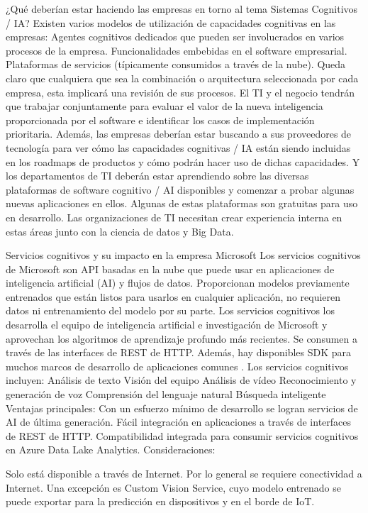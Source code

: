 ¿Qué deberían estar haciendo las empresas en torno al tema Sistemas Cognitivos / IA?
Existen varios modelos de utilización de capacidades cognitivas en las empresas:
Agentes cognitivos dedicados que pueden ser involucrados en varios procesos de la empresa.
Funcionalidades embebidas en el software empresarial.
Plataformas de servicios (típicamente consumidos a través de la nube).
Queda claro que cualquiera que sea la combinación o arquitectura seleccionada por cada empresa, esta implicará una revisión de sus procesos. El TI y el negocio tendrán que trabajar conjuntamente para evaluar el valor de la nueva inteligencia proporcionada por el software e identificar los casos de implementación prioritaria. Además, las empresas deberían estar buscando a sus proveedores de tecnología para ver cómo las capacidades cognitivas / IA están siendo incluidas en los roadmaps de productos y cómo podrán hacer uso de dichas capacidades. Y los departamentos de TI deberán estar aprendiendo sobre las diversas plataformas de software cognitivo / AI disponibles y comenzar a probar algunas nuevas aplicaciones en ellos. Algunas de estas plataformas son gratuitas para uso en desarrollo. Las organizaciones de TI necesitan crear experiencia interna en estas áreas junto con la ciencia de datos y Big Data.

Servicios cognitivos y su impacto en la empresa Microsoft
Los servicios cognitivos de Microsoft son API basadas en la nube que puede usar en aplicaciones de inteligencia artificial (AI) y flujos de datos. Proporcionan modelos previamente entrenados que están listos para usarlos en cualquier aplicación, no requieren datos ni entrenamiento del modelo por su parte. Los servicios cognitivos los desarrolla el equipo de inteligencia artificial e investigación de Microsoft y aprovechan los algoritmos de aprendizaje profundo más recientes. Se consumen a través de las interfaces de REST de HTTP. Además, hay disponibles SDK para muchos marcos de desarrollo de aplicaciones comunes \cite{Microsoft2022}.
Los servicios cognitivos incluyen:
Análisis de texto
Visión del equipo
Análisis de vídeo
Reconocimiento y generación de voz
Comprensión del lenguaje natural
Búsqueda inteligente
Ventajas principales:
Con un esfuerzo mínimo de desarrollo se logran servicios de AI de última generación.
Fácil integración en aplicaciones a través de interfaces de REST de HTTP.
Compatibilidad integrada para consumir servicios cognitivos en Azure Data Lake Analytics.
Consideraciones:

Solo está disponible a través de Internet. Por lo general se requiere conectividad a Internet. Una excepción es Custom Vision Service, cuyo modelo entrenado se puede exportar para la predicción en dispositivos y en el borde de IoT.


